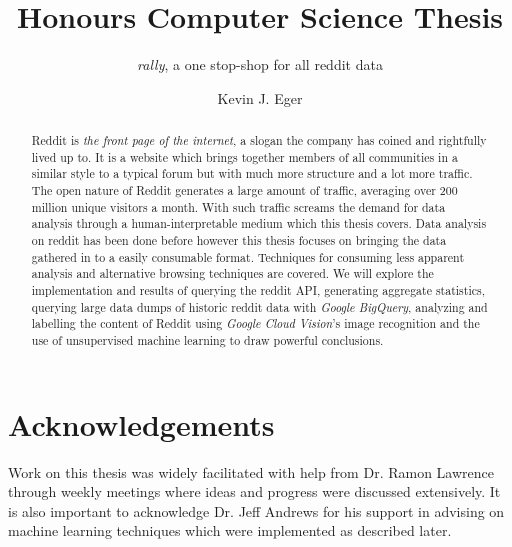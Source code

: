 \documentclass[msc,oneside]{ubcthesis}%
\title{Honours Computer Science Thesis}
\subtitle{\emph{rally}, a one stop-shop for all reddit data}
\author{Kevin J. Eger}
\begin{document}
\frontmatter                    %

\maketitle                      %

\begin{abstract}                %
Reddit is \emph{the front page of the internet}, a slogan the company has coined and rightfully lived up to. It is a website which brings together members of all communities in a similar style to a typical forum but with much more structure and a lot more traffic. The open nature of Reddit generates a large amount of traffic, averaging over 200 million unique visitors a month. With such traffic screams the demand for data analysis through a human-interpretable medium which this thesis covers. Data analysis on reddit has been done before however this thesis focuses on bringing the data gathered in to a easily consumable format. Techniques for consuming less apparent analysis and alternative browsing techniques are covered. We will explore the implementation and results of querying the reddit API, generating aggregate statistics, querying large data dumps of historic reddit data with \emph{Google BigQuery}, analyzing and labelling the content of Reddit using \textit{Google Cloud Vision}'s image recognition and the use of unsupervised machine learning to draw powerful conclusions.
\end{abstract}

\newpage
{} \label{tableofcontent}%
\tableofcontents                %
\newpage 
{} \label{listoftab}%
\listoftables                   %
\newpage
{} \label{listoffig}%
\listoffigures                  %


\chapter{Acknowledgements}      %
Work on this thesis was widely facilitated with help from Dr. Ramon Lawrence through weekly meetings where ideas and progress were discussed extensively. It is also important to acknowledge Dr. Jeff Andrews for his support in advising on machine learning techniques which were implemented as described later.
\end{document}
